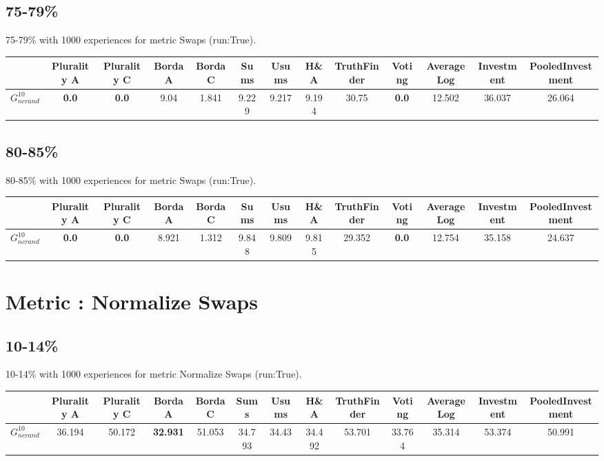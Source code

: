 \documentclass{article}
\newcommand{\graph}[2]{$G_{#1}^{#2}$}
\begin{document}
\subsection{75-79\%}

75-79\% with 1000 experiences for metric Swaps (run:True).

\noindent\begin{tabular}{|l|c|c|c|c|c|c|c|c|c|c|c|c|}
\hline
& Plurality A& Plurality C& Borda A& Borda C& Sums& Usums& H\&A& TruthFinder& Voting& AverageLog& Investment& PooledInvestment\\
\hline
\graph{ncrand}{10} &\textbf{0.0}&\textbf{0.0}&9.04&1.841&9.229&9.217&9.194&30.75&\textbf{0.0}&12.502&36.037&26.064\\
\hline
\end{tabular}
\newpage

\subsection{80-85\%}

80-85\% with 1000 experiences for metric Swaps (run:True).

\noindent\begin{tabular}{|l|c|c|c|c|c|c|c|c|c|c|c|c|}
\hline
& Plurality A& Plurality C& Borda A& Borda C& Sums& Usums& H\&A& TruthFinder& Voting& AverageLog& Investment& PooledInvestment\\
\hline
\graph{ncrand}{10} &\textbf{0.0}&\textbf{0.0}&8.921&1.312&9.848&9.809&9.815&29.352&\textbf{0.0}&12.754&35.158&24.637\\
\hline
\end{tabular}
\newpage
\newpage
\section{Metric : Normalize Swaps}

\newpage

\subsection{10-14\%}

10-14\% with 1000 experiences for metric Normalize Swaps (run:True).

\noindent\begin{tabular}{|l|c|c|c|c|c|c|c|c|c|c|c|c|}
\hline
& Plurality A& Plurality C& Borda A& Borda C& Sums& Usums& H\&A& TruthFinder& Voting& AverageLog& Investment& PooledInvestment\\
\hline
\graph{ncrand}{10} &36.194&50.172&\textbf{32.931}&51.053&34.793&34.43&34.492&53.701&33.764&35.314&53.374&50.991\\
\hline
\end{tabular}
\newpage
\end{document}
